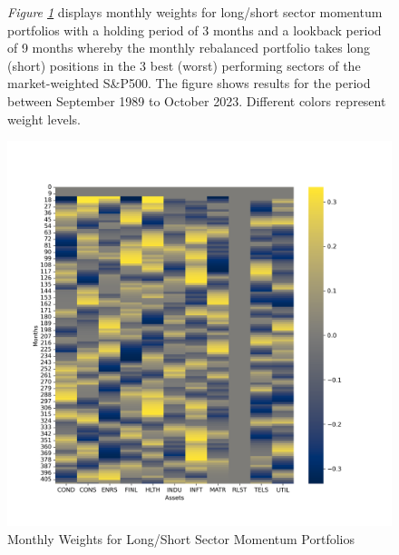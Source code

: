 \documentclass[a4paper,12pt,twoside]{article}
\begin{document}
\begin{figure}[H]
           \captionsetup{justification=centering}
   \caption{Monthly Weights for Long/Short Sector Momentum Portfolios}
    \label{fig_12}
    \textit{Figure \ref{fig_12}} displays monthly weights for long/short sector momentum portfolios with a holding period of 3 months and a lookback period of 9 months whereby the monthly rebalanced portfolio takes long (short) positions in the 3 best (worst) performing sectors of the market-weighted S\&P500. The figure shows results for the period between September 1989 to October 2023. Different colors represent weight levels.
    \centerline{\includegraphics[width=1\textwidth]{Plots/strategy_weights_long_short_Sectors.png}}
\end{figure}
\end{document}
